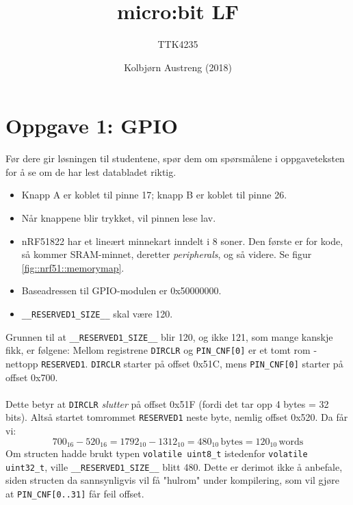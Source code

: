 \documentclass[11pt,a4paper]{article}
\title{micro:bit LF}
\author{TTK4235}
\date{Kolbjørn Austreng (2018)}
\begin{document}
\maketitle
\section{Oppgave 1: GPIO}
Før dere gir løsningen til studentene, spør dem om spørsmålene i oppgaveteksten for å se om de har lest databladet riktig.
\begin{itemize}
\item Knapp A er koblet til pinne 17; knapp B er koblet til pinne 26.
\item Når knappene blir trykket, vil pinnen lese lav.
\item nRF51822 har et lineært minnekart inndelt i 8 soner. Den første er for kode, så kommer SRAM-minnet, deretter \textit{peripherals}, og så videre. Se figur \ref{fig::nrf51::memorymap}.
\item Baseadressen til GPIO-modulen er 0x50000000.
\item \verb!__RESERVED1_SIZE__! skal være 120.
\end{itemize}
Grunnen til at \verb!__RESERVED1_SIZE__! blir 120, og ikke 121, som mange kanskje fikk, er følgene: Mellom registrene \verb!DIRCLR! og \verb!PIN_CNF[0]! er et tomt rom - nettopp \verb!RESERVED1!. \verb!DIRCLR! starter på offset 0x51C, mens \verb!PIN_CNF[0]! starter på offset 0x700.\\
\\
Dette betyr at \verb!DIRCLR! \textit{slutter} på offset 0x51F (fordi det tar opp 4 bytes = 32 bits). Altså startet tomrommet \verb!RESERVED1! neste byte, nemlig offset 0x520. Da får vi:
\begin{equation}
700_{16} - 520_{16} = 1792_{10} - 1312_{10} = 480_{10}\,\mathrm{bytes} = 120_{10}\,\mathrm{words}
\end{equation}
Om structen hadde brukt typen \verb!volatile uint8_t! istedenfor \verb!volatile uint32_t!, ville \verb!__RESERVED1_SIZE__! blitt 480. Dette er derimot ikke å anbefale, siden structen da sannsynligvis vil få "hulrom" under kompilering, som vil gjøre at \verb!PIN_CNF[0..31]! får feil offset.
\end{document}

